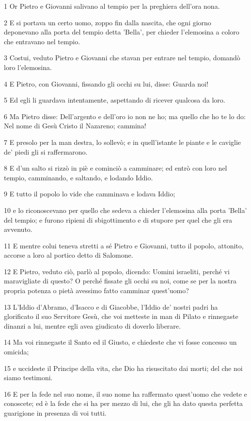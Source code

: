 \par 1 Or Pietro e Giovanni salivano al tempio per la preghiera dell'ora nona.
\par 2 E si portava un certo uomo, zoppo fin dalla nascita, che ogni giorno deponevano alla porta del tempio detta 'Bella', per chieder l'elemosina a coloro che entravano nel tempio.
\par 3 Costui, veduto Pietro e Giovanni che stavan per entrare nel tempio, domandò loro l'elemosina.
\par 4 E Pietro, con Giovanni, fissando gli occhi su lui, disse: Guarda noi!
\par 5 Ed egli li guardava intentamente, aspettando di ricever qualcosa da loro.
\par 6 Ma Pietro disse: Dell'argento e dell'oro io non ne ho; ma quello che ho te lo do: Nel nome di Gesù Cristo il Nazareno; cammina!
\par 7 E presolo per la man destra, lo sollevò; e in quell'istante le piante e le caviglie de' piedi gli si raffermarono.
\par 8 E d'un salto si rizzò in piè e cominciò a camminare; ed entrò con loro nel tempio, camminando, e saltando, e lodando Iddio.
\par 9 E tutto il popolo lo vide che camminava e lodava Iddio;
\par 10 e lo riconoscevano per quello che sedeva a chieder l'elemosina alla porta 'Bella' del tempio; e furono ripieni di sbigottimento e di stupore per quel che gli era avvenuto.
\par 11 E mentre colui teneva stretti a sé Pietro e Giovanni, tutto il popolo, attonito, accorse a loro al portico detto di Salomone.
\par 12 E Pietro, veduto ciò, parlò al popolo, dicendo: Uomini israeliti, perché vi maravigliate di questo? O perché fissate gli occhi su noi, come se per la nostra propria potenza o pietà avessimo fatto camminar quest'uomo?
\par 13 L'Iddio d'Abramo, d'Isacco e di Giacobbe, l'Iddio de' nostri padri ha glorificato il suo Servitore Gesù, che voi metteste in man di Pilato e rinnegaste dinanzi a lui, mentre egli avea giudicato di doverlo liberare.
\par 14 Ma voi rinnegaste il Santo ed il Giusto, e chiedeste che vi fosse concesso un omicida;
\par 15 e uccideste il Principe della vita, che Dio ha risuscitato dai morti; del che noi siamo testimoni.
\par 16 E per la fede nel suo nome, il suo nome ha raffermato quest'uomo che vedete e conoscete; ed è la fede che si ha per mezzo di lui, che gli ha dato questa perfetta guarigione in presenza di voi tutti.

